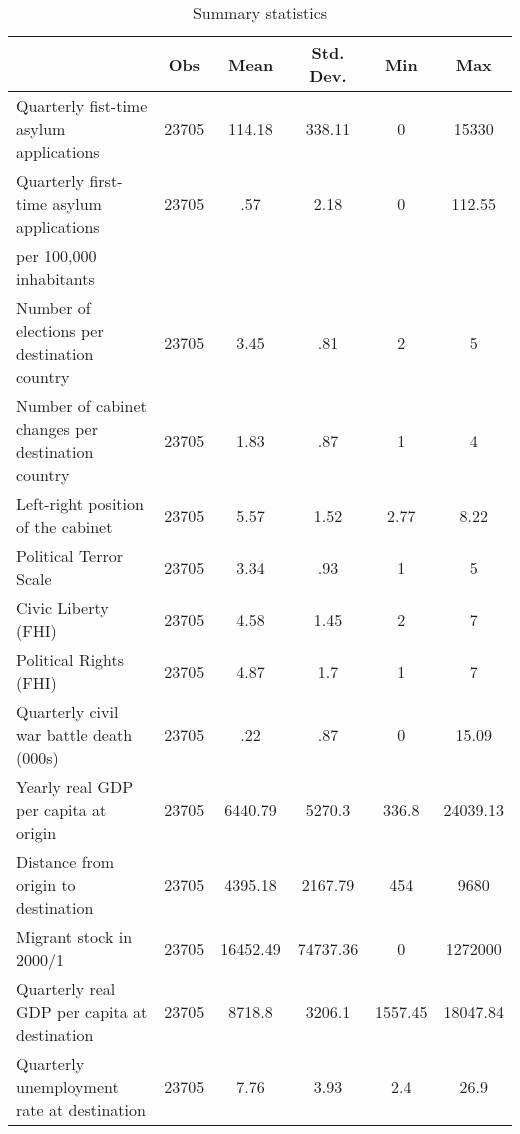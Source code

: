 \begin{table}[htbp]
 \caption{Summary statistics\label{sumstat}}
\begin{tabular}{l c c c c c }
\hline\hline
 & Obs & Mean & Std. Dev. & Min & Max  \\
  \hline
Quarterly fist-time asylum applications & 23705 & 114.18 & 338.11 & 0 & 15330  \\
[0.5em]
Quarterly first-time asylum applications  & 23705 & .57 & 2.18 & 0 & 112.55  \\
per 100,000 inhabitants & &  &  &  &   \\
[0.5em]
Number of elections per destination country & 23705 & 3.45 & .81 & 2 & 5  \\
[0.5em]
Number of cabinet changes per destination country & 23705 & 1.83 & .87 & 1 & 4  \\
[0.5em]
Left-right position of the cabinet & 23705 & 5.57 & 1.52 & 2.77 & 8.22  \\
[0.5em]
Political Terror Scale & 23705 & 3.34 & .93 & 1 & 5  \\
[0.5em]
Civic Liberty (FHI) & 23705 & 4.58 & 1.45 & 2 & 7  \\
[0.5em]
Political Rights (FHI) & 23705 & 4.87 & 1.7 & 1 & 7  \\
[0.5em]
Quarterly civil war battle death (000s) & 23705 & .22 & .87 & 0 & 15.09  \\
[0.5em]
Yearly real GDP per capita at origin & 23705 & 6440.79 & 5270.3 & 336.8 & 24039.13  \\
[0.5em]
Distance from origin to destination & 23705 & 4395.18 & 2167.79 & 454 & 9680  \\
[0.5em]
Migrant stock in 2000/1 & 23705 & 16452.49 & 74737.36 & 0 & 1272000  \\
[0.5em]
Quarterly real GDP per capita at destination & 23705 & 8718.8 & 3206.1 & 1557.45 & 18047.84  \\
[0.5em]
Quarterly unemployment rate at destination & 23705 & 7.76 & 3.93 & 2.4 & 26.9  \\
[0.5em]
\hline\end{tabular}
\end{table}
